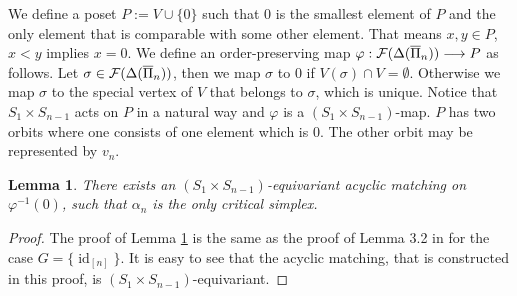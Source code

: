 \documentclass{elsarticle}
\newtheorem{lem}[df]{Lemma}
\def\id{\operatorname{id}}
\begin{document}
We define a poset $P:=V\cup\{0\}$ such that $0$ is the smallest element of $P$ and the only element that is comparable with some other element. That means $x,y\in P$, $x<y$ implies $x=0$. We define an order-preserving map $\varphi:{\cal F}(\Delta(\overline{\Pi}_n))\longrightarrow P$ as follows. Let $\sigma\in{\cal F}(\Delta(\overline{\Pi}_n))$, then we map $\sigma$ to $0$ if $V(\sigma)\cap V=\emptyset$. Otherwise we map $\sigma$ to the special vertex of $V$ that belongs to $\sigma$, which is unique. Notice that $S_1\times S_{n-1}$ acts on $P$ in a natural way and $\varphi$ is a $(S_1\times S_{n-1})$-map. $P$ has two orbits where one consists of one element which is $0$. The other orbit may be represented by $v_n$.
\begin{lem}
\label{mitte}
There exists an $(S_1\times S_{n-1})$-equivariant acyclic matching on $\varphi^{-1}(0)$, such that $\alpha_n$ is the only critical simplex.
\end{lem}
\begin{proof}
The proof of Lemma \ref{mitte} is the same as the proof of Lemma 3.2 in \cite{donau} for the case $G=\{\id_{[n]}\}$. It is easy to see that the acyclic matching, that is constructed in this proof, is $(S_1\times S_{n-1})$-equivariant.
\end{proof}
\end{document}
